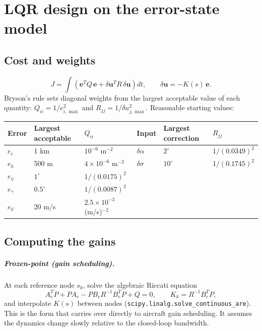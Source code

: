 \documentclass[11pt]{report}
\numberwithin{equation}{chapter}
\newcommand{\vb}[1]{\bm{#1}}
\newcommand{\code}[1]{\texttt{#1}}
\begin{document}
\chapter{LQR design on the error-state model}\label{ch:lqr}

\section{Cost and weights}

\begin{equation}
  J = \int\left(\vb e^T Q\,\vb e + \delta\vb u^T R\,\delta\vb u\right)dt,\qquad
  \delta\vb u = -K(s)\,\vb e .
\end{equation}
Bryson's rule sets diagonal weights from the largest acceptable value of each quantity:
$Q_{ii} = 1/e_{i,\max}^2$ and $R_{jj} = 1/\delta u_{j,\max}^2$. Reasonable starting values:
\begin{center}
\begin{tabular}{@{}lll@{\qquad}lll@{}}
\toprule
Error & Largest acceptable & $Q_{ii}$ & Input & Largest correction & $R_{jj}$ \\
\midrule
$e_c$ & 1 km & $10^{-6}$ m$^{-2}$ & $\delta\alpha$ & $2^\circ$ & $1/(0.0349)^2$ \\
$e_h$ & 500 m & $4\times10^{-6}$ m$^{-2}$ & $\delta\sigma$ & $10^\circ$ & $1/(0.1745)^2$ \\
$e_\psi$ & $1^\circ$ & $1/(0.0175)^2$ & & & \\
$e_\gamma$ & $0.5^\circ$ & $1/(0.0087)^2$ & & & \\
$e_V$ & 20 m/s & $2.5\times10^{-3}$ (m/s)$^{-2}$ & & & \\
\bottomrule
\end{tabular}
\end{center}

\section{Computing the gains}

\paragraph{Frozen-point (gain scheduling).} At each reference node $s_k$, solve the algebraic
Riccati equation
\begin{equation}
  A_e^T P + P A_e - P B_e R^{-1} B_e^T P + Q = 0,\qquad K_k = R^{-1}B_e^T P,
\end{equation}
and interpolate $K(s)$ between nodes (\code{scipy.linalg.solve\_continuous\_are}). This is the
form that carries over directly to aircraft gain scheduling. It assumes the dynamics change
slowly relative to the closed-loop bandwidth.
\end{document}
